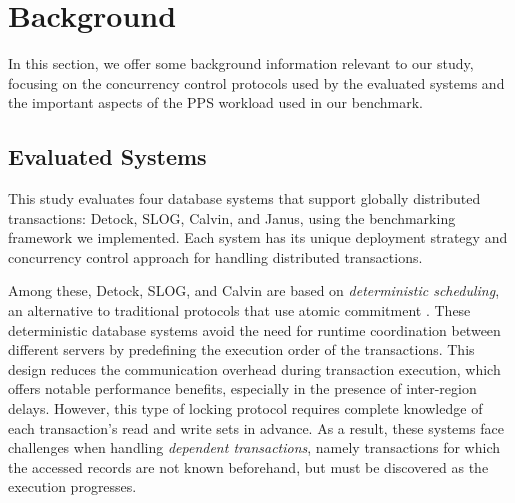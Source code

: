 \section{Background}
\label{sec: background}
In this section, we offer some background information relevant to our study, focusing on the concurrency control protocols used by the evaluated systems and the important aspects of the PPS workload used in our benchmark.

\subsection{Evaluated Systems}
This study evaluates four database systems that support globally distributed transactions: Detock, SLOG, Calvin, and Janus, using the benchmarking framework we implemented. Each system has its unique deployment strategy and concurrency control approach for handling distributed transactions.

Among these, Detock, SLOG, and Calvin are based on \textit{deterministic scheduling}, an alternative to traditional protocols that use atomic commitment \cite{thomson2010case}. These deterministic database systems avoid the need for runtime coordination between different servers by predefining the execution order of the transactions. This design reduces the communication overhead during transaction execution, which offers notable performance benefits, especially in the presence of inter-region delays. However, this type of locking protocol requires complete knowledge of each transaction's read and write sets in advance. As a result, these systems face challenges when handling \textit{dependent transactions}, namely transactions for which the accessed records are not known beforehand, but must be discovered as the execution progresses.


